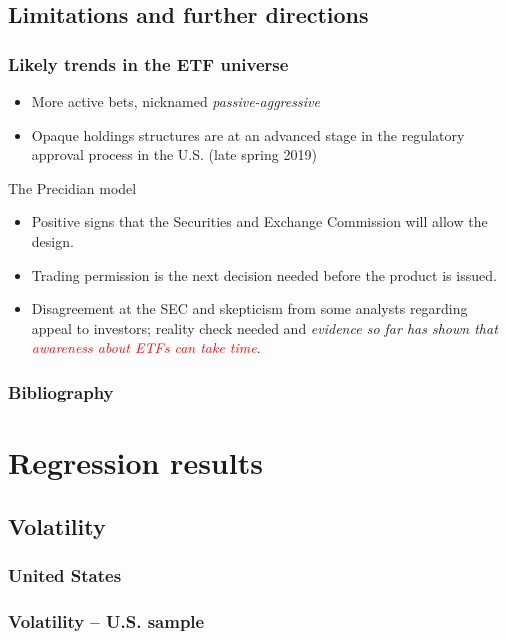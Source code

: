 \documentclass[9pt, usenames, dvipsnames]{beamer}
\begin{document}
\subsection{Limitations and further directions}

\begin{frame}[allowframebreaks]
  \frametitle{Likely trends in the ETF universe}
  \begin{itemize}
  \item More active bets, nicknamed \textit{passive-aggressive}
  \item Opaque holdings structures are at an advanced stage in the regulatory approval process in the U.S. (late spring 2019)
    
  \end{itemize}
  \begin{block}{The Precidian model}
    \begin{itemize}
    \item Positive signs that the Securities and Exchange Commission will allow the design.
    \item Trading permission is the next decision needed before the product is issued.
    \item Disagreement at the SEC and skepticism from some analysts regarding appeal to investors; reality check needed and \textit{evidence so far has shown that \textcolor{red}{awareness about ETFs can take time}}.
    \end{itemize}
    
  \end{block}
  
\end{frame}


\begin{frame}
  \frametitle{Bibliography}
  \printbibliography
\end{frame}
\appendix
\section{Regression results}
\subsection{Volatility}
\subsubsection{United States}
\begin{frame}[allowframebreaks, t]
  \frametitle{Volatility -- U.S. sample}
  \centering
  
\end{frame}
\end{document}
